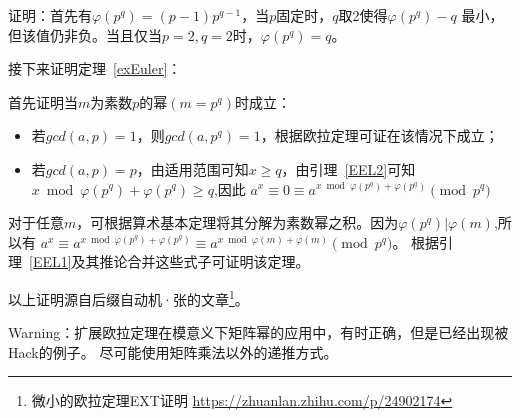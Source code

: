 证明：首先有$\varphi(p^q)=(p-1)p^{q-1}$，当$p$固定时，$q$取2使得$\varphi(p^q)-q$
最小，但该值仍非负。当且仅当$p=2,q=2$时，$\varphi(p^q)=q$。

接下来证明定理~\ref{exEuler}：

首先证明当$m$为素数$p$的幂$(m=p^q)$时成立：
\begin{itemize}
	\item 若$gcd(a,p)=1$，则$gcd(a,p^q)=1$，根据欧拉定理可证在该情况下成立；
	\item 若$gcd(a,p)=p$，由适用范围可知$x\geq q$，由引理~\ref{EEL2}可知
	      $x \bmod \varphi(p^q) + \varphi(p^q) \geq q$,因此
	      $a^x\equiv 0 \equiv a^{x \bmod \varphi(p^q)+\varphi(p^q)} \pmod{p^q}$
\end{itemize}

对于任意$m$，可根据算术基本定理将其分解为素数幂之积。因为$\varphi(p^q)|\varphi(m)$,所以有
$a^x\equiv a^{x \bmod \varphi(p^q)+\varphi(p^q)}
	\equiv a^{x \bmod \varphi(m)+\varphi(m)} \pmod{p^q}$。
根据引理~\ref{EEL1}及其推论合并这些式子可证明该定理。

以上证明源自后缀自动机·张的文章\footnote{微小的欧拉定理EXT证明
	\url{https://zhuanlan.zhihu.com/p/24902174}}。

{Warning：扩展欧拉定理在模意义下矩阵幂的应用中，有时正确，但是已经出现被Hack的例子。
尽可能使用矩阵乘法以外的递推方式。}

